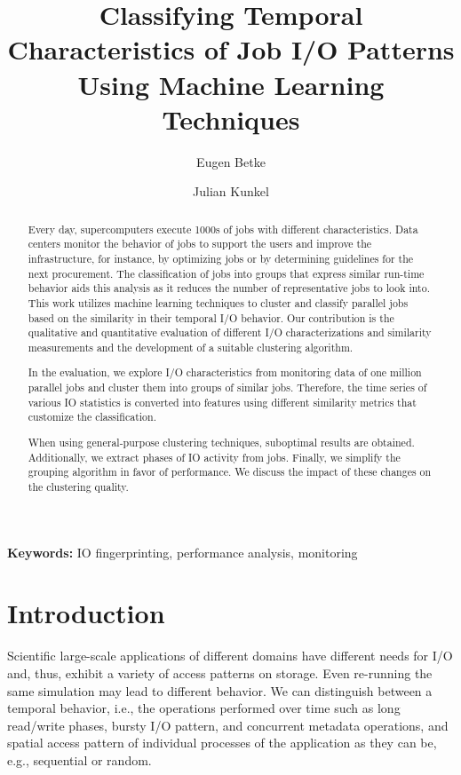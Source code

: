 \documentclass[]{llncs}
\begin{document}
\title{Classifying Temporal Characteristics of Job I/O Patterns Using Machine Learning Techniques}



\author{Eugen Betke  \and  Julian Kunkel}

\maketitle

\begin{abstract}
Every day, supercomputers execute 1000s of jobs with different characteristics.
Data centers monitor the behavior of jobs to support the users and improve the infrastructure, for instance, by optimizing jobs or by determining guidelines for the next procurement.
The classification of jobs into groups that express similar run-time behavior aids this analysis as it reduces the number of representative jobs to look into.
This work utilizes machine learning techniques to cluster and classify parallel jobs based on the similarity in their temporal I/O behavior.
Our contribution is the qualitative and quantitative evaluation of different I/O characterizations and similarity measurements and the development of a suitable clustering algorithm.

In the evaluation, we explore I/O characteristics from monitoring data of one million parallel jobs and cluster them into groups of similar jobs.
Therefore, the time series of various IO statistics is converted into features using different similarity metrics that customize the classification.

When using general-purpose clustering techniques, suboptimal results are obtained.
Additionally, we extract phases of IO activity from jobs.
Finally, we simplify the grouping algorithm in favor of performance.
We discuss the impact of these changes on the clustering quality.
\end{abstract}

\textbf{Keywords: }IO fingerprinting, performance analysis, monitoring

\section{Introduction}
Scientific large-scale applications of different domains have different needs for I/O and, thus, exhibit a variety of access patterns on storage.
Even re-running the same simulation may lead to different behavior.
We can distinguish between a temporal behavior, i.e., the operations performed over time such as long read/write phases, bursty I/O pattern, and concurrent metadata operations, and spatial access pattern of individual processes of the application as they can be, e.g., sequential or random.
\end{document}
